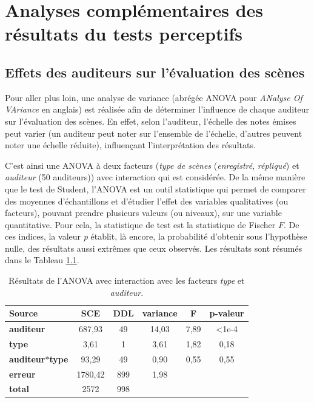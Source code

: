 \chapter{Analyses complémentaires des résultats du tests perceptifs}\label{annexe:anova}


\section{Effets des auditeurs sur l'évaluation des scènes}

Pour aller plus loin, une analyse de variance (abrégée ANOVA pour \textit{ANalyse Of VAriance} en anglais) est réalisée afin de déterminer l'influence de chaque auditeur sur l'évaluation des scènes. En effet, selon l'auditeur, l'échelle des notes émises peut varier (un auditeur peut noter sur l'ensemble de l'échelle, d'autres peuvent noter une échelle réduite), influençant l'interprétation des résultats.

C'est ainsi une ANOVA à deux facteurs (\textit{type de scènes} (\textit{enregistré}, \textit{répliqué}) et \textit{auditeur} (50 auditeurs)) avec interaction qui est considérée. De la même manière que le test de Student, l'ANOVA est un outil statistique qui permet de comparer des moyennes d'échantillons et d'étudier l'effet des variables qualitatives (ou facteurs), pouvant prendre plusieurs valeurs (ou niveaux), sur une variable quantitative.
Pour cela, la statistique de test est la statistique de Fischer $F$. De ces indices, la valeur \textit{p} établit, là encore, la probabilité d'obtenir sous l'hypothèse nulle, des résultats aussi extrêmes que ceux observés. Les résultats sont résumés dans le Tableau \ref{tab:anova_auditeur}.

\begin{table}[ht]
\centering
\begin{tabular}{lccccc}
\hline
\textbf{Source}     & \textbf{SCE} & \textbf{DDL} & \textbf{variance} & \textbf{F} & \textbf{p-valeur} \\
\hline
\textbf{auditeur} & 687,93 & 49 & 14,03 & 7,89 & <1e-4 \\
\hline
\textbf{type} & 3,61 & 1 & 3,61 & 1,82 & 0,18 \\
\hline
\textbf{auditeur$*$type} & 93,29 & 49 & 0,90 & 0,55 & 0,55 \\
\hline
\textbf{erreur}      & 1780,42 & 899 & 1,98 & &  \\
\hline
\textbf{total}      & 2572 & 998 & & & \\
\hline
\end{tabular}
\caption{Résultats de l'ANOVA avec interaction avec les facteurs \textit{type} et \textit{auditeur}.}
\label{tab:anova_auditeur}
\end{table}

